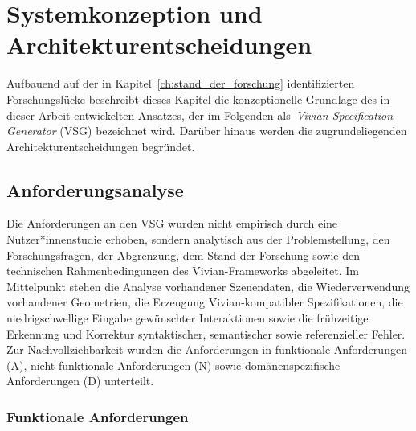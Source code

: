 \chapter{Systemkonzeption und Architekturentscheidungen}\label{ch:systemkonzeption}

Aufbauend auf der in Kapitel~\ref{ch:stand_der_forschung} identifizierten Forschungslücke beschreibt dieses Kapitel die konzeptionelle Grundlage des in dieser Arbeit entwickelten Ansatzes, der im Folgenden als~\textit{Vivian Specification Generator} (VSG) bezeichnet wird. Darüber hinaus werden die zugrundeliegenden Architekturentscheidungen begründet.

\section{Anforderungsanalyse}

Die Anforderungen an den VSG wurden nicht empirisch durch eine Nutzer*innenstudie erhoben, sondern analytisch aus der Problemstellung, den Forschungsfragen, der Abgrenzung, dem Stand der Forschung sowie den technischen Rahmenbedingungen des Vivian-Frameworks abgeleitet.
Im Mittelpunkt stehen die Analyse vorhandener Szenendaten, die Wiederverwendung vorhandener Geometrien, die Erzeugung Vivian-kompatibler Spezifikationen, die niedrigschwellige Eingabe gewünschter Interaktionen sowie die frühzeitige Erkennung und Korrektur syntaktischer, semantischer sowie referenzieller Fehler.
Zur Nachvollziehbarkeit wurden die Anforderungen in funktionale Anforderungen (A), nicht-funktionale Anforderungen (N) sowie domänenspezifische Anforderungen (D) unterteilt.

\subsection{Funktionale Anforderungen}


